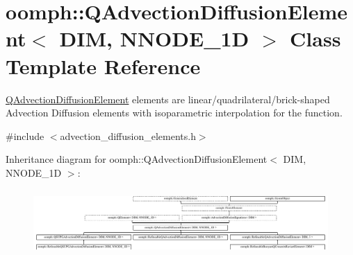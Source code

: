 \hypertarget{classoomph_1_1QAdvectionDiffusionElement}{}\section{oomph\+:\+:Q\+Advection\+Diffusion\+Element$<$ D\+IM, N\+N\+O\+D\+E\+\_\+1D $>$ Class Template Reference}
\label{classoomph_1_1QAdvectionDiffusionElement}


\hyperlink{classoomph_1_1QAdvectionDiffusionElement}{Q\+Advection\+Diffusion\+Element} elements are linear/quadrilateral/brick-\/shaped Advection Diffusion elements with isoparametric interpolation for the function.  




{\ttfamily \#include $<$advection\+\_\+diffusion\+\_\+elements.\+h$>$}

Inheritance diagram for oomph\+:\+:Q\+Advection\+Diffusion\+Element$<$ D\+IM, N\+N\+O\+D\+E\+\_\+1D $>$\+:\begin{figure}[H]
\begin{center}
\leavevmode
\includegraphics[height=2.539682cm]{classoomph_1_1QAdvectionDiffusionElement}
\end{center}
\end{figure}
